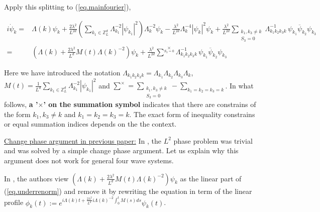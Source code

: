 Apply this splitting to (\ref{eq.mainfourier}),

\begin{equation}\label{eq.underrenorm}
\begin{split}
i \dot{\psi}_{k} =&  \Lambda(k) \psi_k
+\frac{2\lambda^2}{L^{2d}} \left(\sum\limits_{k_1\in \mathbb{Z}^d_L} \Lambda_{k_1}^{-2}|\psi_{k_1}|^2 \right) \Lambda_{k}^{-2}\psi_{k}
-\frac{\lambda^2}{L^{2d}}  \Lambda_{k}^{-4}|\psi_{k}|^2 \psi_{k}
+\frac{\lambda^2}{L^{2d}} \sum\limits_{\substack{k_1, k_3\neq k \\ S_3=0}}  \Lambda_{k_1k_2k_3k}^{-1}\,\psi_{k_1}\overline{\psi}_{k_2}  \psi_{k_3}
\\
=&  \left(\Lambda(k)+\frac{2\lambda^2}{L^{d}} M(t)\Lambda(k)^{-2}\right) \psi_k
+\frac{\lambda^2}{L^{2d}} \sum^{\times}\limits_{S_3=0}  \Lambda_{k_1k_2k_3k}^{-1}\,\psi_{k_1}\overline{\psi}_{k_2}  \psi_{k_3}
\end{split}
\end{equation}

Here we have introduced the notation $\Lambda_{k_1k_2k_3k}=\Lambda_{k_1}\Lambda_{k_2}\Lambda_{k_3}\Lambda_{k}$, $M(t)=\frac{1}{L^{d}} \sum\limits_{k_1\in \mathbb{Z}^d_L} \Lambda_{k_1}^{-2}|\psi_{k_1}|^2$ and  $\sum^{\times}=\sum\limits_{\substack{k_1, k_3\neq k \\ S_3=0}}-\sum_{k_1=k_2=k_3=k}$. In what follows, \textbf{a '$\times$' on the summation symbol} indicates that there are constrains of the form $k_1, k_3\neq k$ and $k_1=k_2=k_3=k$. The exact form of inequality constrains or equal summation indices depends on the the context. 

\underline{Change phase argument in previous paper:} In \cite{deng2021derivation}, the $L^2$ phase problem was trivial and was solved by a simple change phase argument. Let us explain why this argument does not work for general four wave systems.

In \cite{deng2021derivation}, the authors view $\left(\Lambda(k)+\frac{2\lambda^2}{L^{d}} M(t)\Lambda(k)^{-2}\right) \psi_k$ as the linear part of (\ref{eq.underrenorm}) and remove it by rewriting the equation in term of the linear profile $\phi_k(t):= e^{i\Lambda(k) t+\frac{2\lambda^2}{L^{d}} i \Lambda(k)^{-2}\int^t_{0}M(s) ds}  \psi_k(t)$.
 
